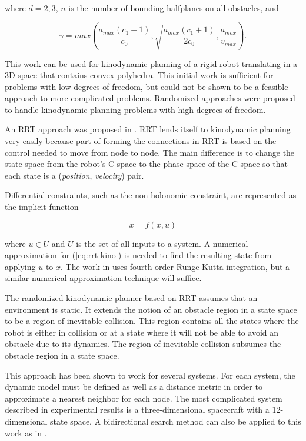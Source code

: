 where $d=2,3$, $n$ is the number of bounding halfplanes on all obstacles, and 

\begin{equation}
\gamma = max \left( \frac{a_{max}(c_1+1)}{c_0}, \sqrt{ \frac{a_{max}(c_1+1)}{2c_0} }, \frac{a_{max}}{v_{max}}\right).
\end{equation}


This work can be used for kinodynamic planning of a rigid robot translating in a 3D space that contains convex polyhedra. This initial work is sufficient for problems with low degrees of freedom, but could not be shown to be a feasible approach to more complicated problems. Randomized approaches were proposed to handle kinodynamic planning problems with high degrees of freedom.

An RRT approach was proposed in \cite{lavalle2001randomized}. RRT lends itself to kinodynamic planning very easily because part of forming the connections in RRT is based on the control needed to move from node to node. The main difference is to change the state space from the robot's C-space to the phase-space of the C-space so that each state is a (\emph{position}, \emph{velocity}) pair.

Differential constraints, such as the non-holonomic constraint, are represented as the implicit function

\begin{equation}
\label{eq:rrt-kino} \dot{x} = f(x,u)
\end{equation}

where $u \in U$ and $U$ is the set of all inputs to a system. A numerical approximation for (\ref{eq:rrt-kino}) is needed to find the resulting state from applying $u$ to $x$. The work in \cite{lavalle2001randomized} uses fourth-order Runge-Kutta integration, but a similar numerical approximation technique will suffice.

The randomized kinodynamic planner based on RRT assumes that an environment is static. It extends the notion of an obstacle region in a state space to be a region of inevitable collision. This region contains all the states where the robot is either in collision or at a state where it will not be able to avoid an obstacle due to its dynamics. The region of inevitable collision subsumes the obstacle region in a state space.

This approach has been shown to work for several systems. For each system, the dynamic model must be defined as well as a distance metric in order to approximate a nearest neighbor for each node. The most complicated system described in experimental results is a three-dimensional spacecraft with a 12-dimensional state space. A bidirectional search method can also be applied to this work as in \cite{kuffner2000rrt}.

